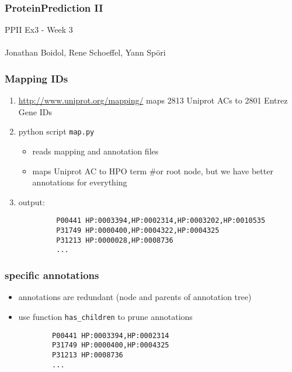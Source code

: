\documentclass{beamer}
\begin{document}
\begin{frame}
 \frametitle{ProteinPrediction II}
 PPII Ex3 - Week 3\\
 \hfill \\
 Jonathan Boidol, Rene Schoeffel, Yann Sp\"ori
\end{frame}

\begin{frame}[fragile]
 \frametitle{Mapping IDs}
 \begin{enumerate}
 \item \url{http://www.uniprot.org/mapping/} maps 2813 Uniprot ACs to 2801 Entrez Gene IDs
 \item python script \texttt{map.py}
         \begin{itemize}
         \item reads mapping and annotation files
         \item maps Uniprot AC to HPO term {\color{gray}\#or root node, but we have better annotations for everything}
         \end{itemize}
 \item output:\\
 \begin{verbatim}
         P00441 HP:0003394,HP:0002314,HP:0003202,HP:0010535
         P31749 HP:0000400,HP:0004322,HP:0004325
         P31213 HP:0000028,HP:0008736
         ...
 \end{verbatim}
\end{enumerate}
\end{frame}

\begin{frame}[fragile]
 \frametitle{specific annotations}

        \begin{itemize}
        \item annotations are redundant (node and parents of annotation tree)
        \item use function \texttt{has\_children} to prune annotations
\begin{verbatim}
        P00441 HP:0003394,HP:0002314
        P31749 HP:0000400,HP:0004325
        P31213 HP:0008736
        ...
 \end{verbatim}
        \end{itemize}

 
\end{frame}
\end{document}
